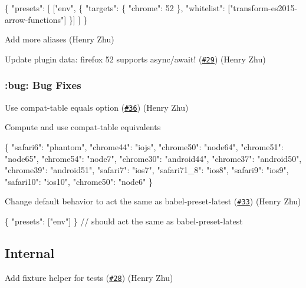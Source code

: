 \begin{DoxyCode}
 \{
  "presets": [
    ["env", \{
      "targets": \{
        "chrome": 52
      \},
      "whitelist": ["transform-es2015-arrow-functions"]
    \}]
  ]
\}
\end{DoxyCode}



\begin{DoxyItemize}
\item Add more aliases (Henry Zhu)
\item Update plugin data\+: firefox 52 supports async/await! (\href{https://github.com/babel/babel-preset-env/pull/29}{\tt \#29}) (Henry Zhu)
\end{DoxyItemize}

\subsubsection*{\+:bug\+: Bug Fixes}


\begin{DoxyItemize}
\item Use compat-\/table equals option (\href{https://github.com/babel/babel-preset-env/pull/36}{\tt \#36}) (Henry Zhu)
\end{DoxyItemize}

Compute and use {\ttfamily compat-\/table} equivalents


\begin{DoxyCode}
\{
  "safari6": "phantom",
  "chrome44": "iojs",
  "chrome50": "node64",
  "chrome51": "node65",
  "chrome54": "node7",
  "chrome30": "android44",
  "chrome37": "android50",
  "chrome39": "android51",
  "safari7": "ios7",
  "safari71\_8": "ios8",
  "safari9": "ios9",
  "safari10": "ios10",
  "chrome50": "node6"
\}
\end{DoxyCode}



\begin{DoxyItemize}
\item Change default behavior to act the same as babel-\/preset-\/latest (\href{https://github.com/babel/babel-preset-env/pull/33}{\tt \#33}) (Henry Zhu)
\end{DoxyItemize}


\begin{DoxyCode}
\{ "presets": ["env"] \} // should act the same as babel-preset-latest
\end{DoxyCode}


\subsection*{Internal}


\begin{DoxyItemize}
\item Add fixture helper for tests (\href{https://github.com/babel/babel-preset-env/pull/28}{\tt \#28}) (Henry Zhu) 
\end{DoxyItemize}